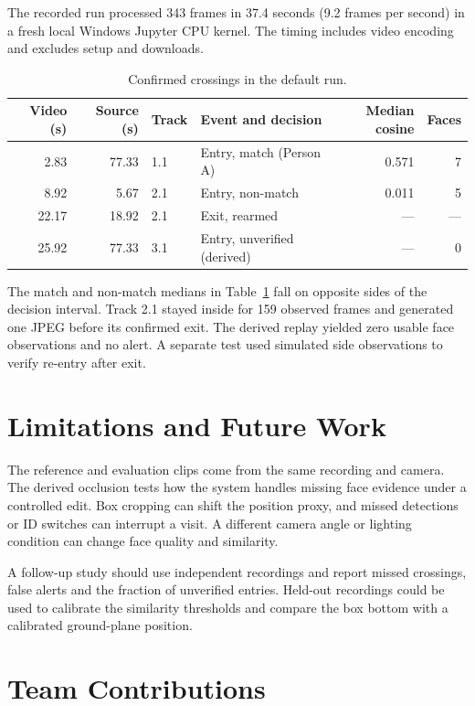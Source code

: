 \documentclass[11pt,a4paper]{article}
\begin{document}
The recorded run processed 343 frames in 37.4 seconds (9.2 frames per second) in a fresh local Windows Jupyter CPU kernel. The timing includes video encoding and excludes setup and downloads.

\begin{table}[!ht]
  \centering
  \caption{Confirmed crossings in the default run.}
  \label{tab:crossings}
  \begin{tabular}{@{}rrllrr@{}}
    \toprule
    Video (s) & Source (s) & Track & Event and decision & Median cosine & Faces \\
    \midrule
    2.83 & 77.33 & 1.1 & Entry, match (Person A) & 0.571 & 7 \\
    8.92 & 5.67 & 2.1 & Entry, non-match & 0.011 & 5 \\
    22.17 & 18.92 & 2.1 & Exit, rearmed & --- & --- \\
    25.92 & 77.33 & 3.1 & Entry, unverified (derived) & --- & 0 \\
    \bottomrule
  \end{tabular}
\end{table}

The match and non-match medians in Table~\ref{tab:crossings} fall on opposite sides of the decision interval. Track 2.1 stayed inside for 159 observed frames and generated one JPEG before its confirmed exit. The derived replay yielded zero usable face observations and no alert. A separate test used simulated side observations to verify re-entry after exit.

\section{Limitations and Future Work}

The reference and evaluation clips come from the same recording and camera. The derived occlusion tests how the system handles missing face evidence under a controlled edit. Box cropping can shift the position proxy, and missed detections or ID switches can interrupt a visit. A different camera angle or lighting condition can change face quality and similarity.

A follow-up study should use independent recordings and report missed crossings, false alerts and the fraction of unverified entries. Held-out recordings could be used to calibrate the similarity thresholds and compare the box bottom with a calibrated ground-plane position.

\section{Team Contributions}
\end{document}
